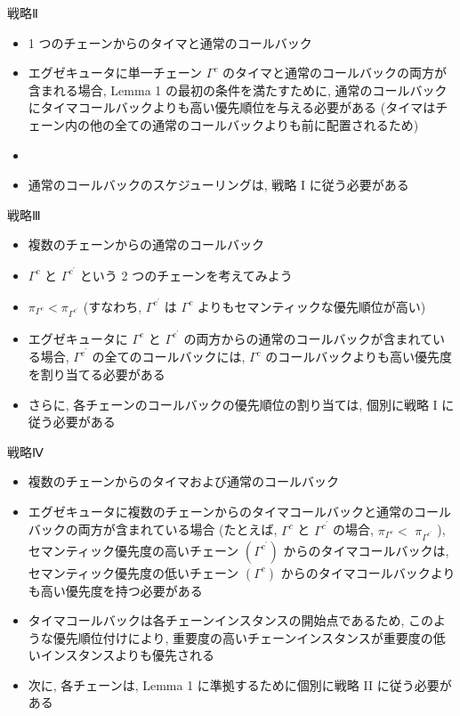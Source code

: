 \begin{frame}{戦略Ⅱ}
    \begin{itemize}
        \item  1 つのチェーンからのタイマと通常のコールバック
        \item エグゼキュータに単一チェーン $\Gamma^{c}$ のタイマと通常のコールバックの両方が含まれる場合, Lemma 1 の最初の条件を満たすために, 通常のコールバックにタイマコールバックよりも高い優先順位を与える必要がある (タイマはチェーン内の他の全ての通常のコールバックよりも前に配置されるため)
        \item
        \item 通常のコールバックのスケジューリングは, 戦略 I に従う必要がある
    \end{itemize}
\end{frame}

\begin{frame}{戦略Ⅲ}
    \begin{itemize}
        \item 複数のチェーンからの通常のコールバック
        \item $\Gamma^{c}$ と $\Gamma^{c^{\prime}}$ という 2 つのチェーンを考えてみよう
        \item $\pi_{\Gamma^{c}}<\pi_{\Gamma^{c^{\prime}}}$ (すなわち,  $\Gamma^{c^{\prime}}$ は $\Gamma^{c}$ よりもセマンティックな優先順位が高い)
        \item エグゼキュータに $\Gamma^{c}$ と $\Gamma^{c^{\prime}}$ の両方からの通常のコールバックが含まれている場合, $\Gamma^{c^{\prime}}$ の全てのコールバックには, $\Gamma^{c}$ のコールバックよりも高い優先度を割り当てる必要がある
        \item さらに, 各チェーンのコールバックの優先順位の割り当ては, 個別に戦略 I に従う必要がある
    \end{itemize}
\end{frame}

\begin{frame}{戦略Ⅳ}
    \begin{itemize}
        \item 複数のチェーンからのタイマおよび通常のコールバック
        \item エグゼキュータに複数のチェーンからのタイマコールバックと通常のコールバックの両方が含まれている場合 (たとえば,  $\Gamma^{c}$ と $\Gamma^{c^{\prime}}$ の場合,  $\pi_{\Gamma^{c}}<$  $\pi_{\Gamma^{c^{\prime}}}$ ), セマンティック優先度の高いチェーン $\left(\Gamma^{c^{\prime}}\right)$ からのタイマコールバックは, セマンティック優先度の低いチェーン $\left(\Gamma^{c}\right)$ からのタイマコールバックよりも高い優先度を持つ必要がある
        \item タイマコールバックは各チェーンインスタンスの開始点であるため, このような優先順位付けにより, 重要度の高いチェーンインスタンスが重要度の低いインスタンスよりも優先される
        \item 次に, 各チェーンは, Lemma 1 に準拠するために個別に戦略 II に従う必要がある
    \end{itemize}
\end{frame}


